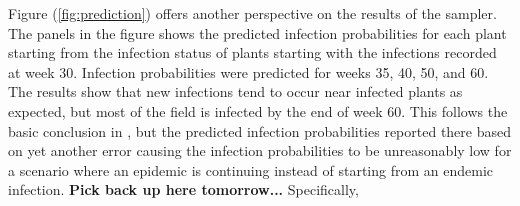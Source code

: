 \documentclass{uwstat572}
\begin{document}
Figure (\ref{fig:prediction}) offers another perspective on the results of the sampler. 
The panels in the figure shows the predicted infection probabilities for each plant starting from the infection status of plants starting with the infections recorded at week 30. 
Infection probabilities were predicted for weeks 35, 40, 50, and 60. 
The results show that new infections tend to occur near infected plants as expected, but most of the field is infected by the end of week 60. 
This follows the basic conclusion in \citet{Brown}, but the predicted infection probabilities reported there based on yet another error causing the infection probabilities to be unreasonably low for a scenario where an epidemic is continuing instead of starting from an endemic infection. 
\textbf{Pick back up here tomorrow...} Specifically, 
\end{document}
